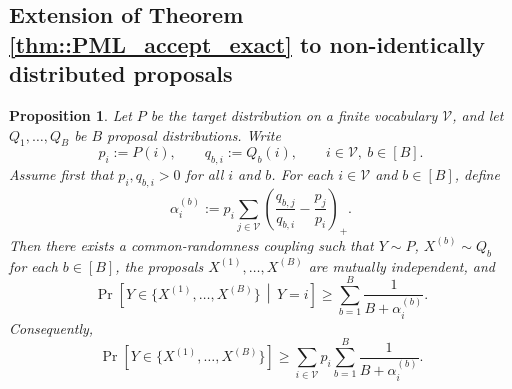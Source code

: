 \documentclass{article}
\theoremstyle{plain}
\newtheorem{proposition}[theorem]{Proposition}
\theoremstyle{definition}
\begin{document}
\subsection{Extension of Theorem \ref{thm::PML_accept_exact} to non-identically distributed proposals}
\label{app::non_id_prop}

\begin{proposition}
\label{prop::heterogeneous_PML_bound}
Let $P$ be the target distribution on a finite vocabulary $\mathcal V$, and let
$Q_1,\ldots,Q_B$ be $B$ proposal distributions. Write
\[
    p_i:=P(i),\qquad q_{b,i}:=Q_b(i),
    \qquad i\in\mathcal V,\ b\in[B].
\]
Assume first that $p_i,q_{b,i}>0$ for all $i$ and $b$. For each $i\in\mathcal V$
and $b\in[B]$, define
\[
    \alpha_i^{(b)}
    :=
    p_i\sum_{j\in\mathcal V}
    \left(
        \frac{q_{b,j}}{q_{b,i}}
        -
        \frac{p_j}{p_i}
    \right)_+ .
\]
Then there exists a common-randomness coupling such that $Y\sim P$,
$X^{(b)}\sim Q_b$ for each $b\in[B]$, the proposals
$X^{(1)},\ldots,X^{(B)}$ are mutually independent, and
\begin{equation}
\label{eq::heterogeneous_PML_conditional}
    \Pr\!\left[
        Y\in\{X^{(1)},\ldots,X^{(B)}\}
        \,\middle|\,Y=i
    \right]
    \ge
    \sum_{b=1}^B
    \frac{1}{B+\alpha_i^{(b)}} .
\end{equation}
Consequently,
\begin{equation}
\label{eq::heterogeneous_PML_unconditional}
    \Pr\!\left[
        Y\in\{X^{(1)},\ldots,X^{(B)}\}
    \right]
    \ge
    \sum_{i\in\mathcal V}
    p_i
    \sum_{b=1}^B
    \frac{1}{B+\alpha_i^{(b)}} .
\end{equation}
\end{proposition}
\end{document}
